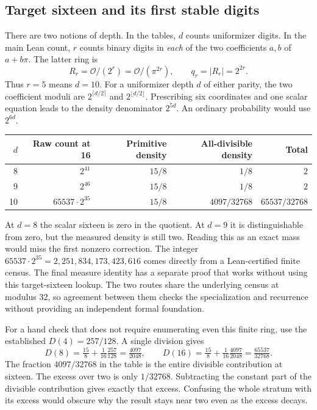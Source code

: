 \documentclass[12pt,letterpaper]{article}
\begin{document}
\subsection{Target sixteen and its first stable digits}
There are two notions of depth. In the tables, $d$ counts uniformizer digits. In the main Lean count, $r$ counts binary digits in \emph{each} of the two coefficients $a,b$ of $a+b\pi$. The latter ring is
\[
 R_r=\mathcal O/(2^r)=\mathcal O/(\pi^{2r}), \qquad q_r=|R_r|=2^{2r}.
\]
Thus $r=5$ means $d=10$. For a uniformizer depth $d$ of either parity, the two coefficient moduli are $2^{\lceil d/2\rceil}$ and $2^{\lfloor d/2\rfloor}$. Prescribing six coordinates and one scalar equation leads to the density denominator $2^{5d}$. An ordinary probability would use $2^{6d}$.

\begin{center}\small\begin{tabular}{rrrrr}\toprule
$d$ & Raw count at 16 & Primitive density & All-divisible density & Total\\\midrule
8 & $2^{41}$ & $15/8$ & $1/8$ & $2$\\
9 & $2^{46}$ & $15/8$ & $1/8$ & $2$\\
10 & $65537\cdot2^{35}$ & $15/8$ & $4097/32768$ & $65537/32768$\\\bottomrule
\end{tabular}\end{center}
At $d=8$ the scalar sixteen is zero in the quotient. At $d=9$ it is distinguishable from zero, but the measured density is still two. Reading this as an exact mass would miss the first nonzero correction. The integer $65537\cdot2^{35}=2{,}251{,}834{,}173{,}423{,}616$ comes directly from a Lean-certified finite census. The final measure identity has a separate proof that works without using this target-sixteen lookup. The two routes share the underlying census at modulus $32$, so agreement between them checks the specialization and recurrence without providing an independent formal foundation.

For a hand check that does not require enumerating even this finite ring, use the established $D(4)=257/128$. A single division gives
\[
 D(8)=\tfrac{15}{8}+\tfrac1{16}\tfrac{257}{128}
      =\tfrac{4097}{2048},\qquad
 D(16)=\tfrac{15}{8}+\tfrac1{16}\tfrac{4097}{2048}
      =\tfrac{65537}{32768}.
\]
The fraction $4097/32768$ in the table is the entire divisible contribution at sixteen. The excess over two is only $1/32768$. Subtracting the constant part of the divisible contribution gives exactly that excess. Confusing the whole stratum with its excess would obscure why the result stays near two even as the excess decays.
\end{document}
